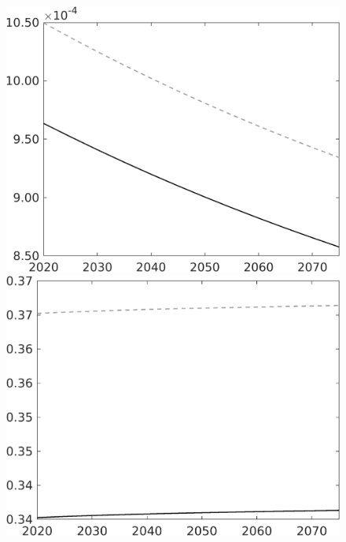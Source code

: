 \documentclass[12pt]{article}
\begin{document}
\begin{figure}[h!!]
\begin{minipage}[]{0.32\textwidth}
	\end{minipage}	
	\begin{minipage}[]{0.32\textwidth}
		\includegraphics[width=1\textwidth]{../../codding_model/own_basedOnFried/optimalPol_010922_revision/figures/all_13Sept22/CompTaul_LFBAU_Reg0_Lg_spillover0_nsk1_xgr1_knspil0_sep1_countec0_GovRev0_etaa0.79_lgd0.png}
	\end{minipage}	
	\begin{minipage}[]{0.32\textwidth}
		\includegraphics[width=1\textwidth]{../../codding_model/own_basedOnFried/optimalPol_010922_revision/figures/all_13Sept22/CompTaul_LFBAU_Reg0_Ln_spillover0_nsk1_xgr1_knspil0_sep1_countec0_GovRev0_etaa0.79_lgd0.png}

\end{minipage}
\end{figure}
\end{document}
